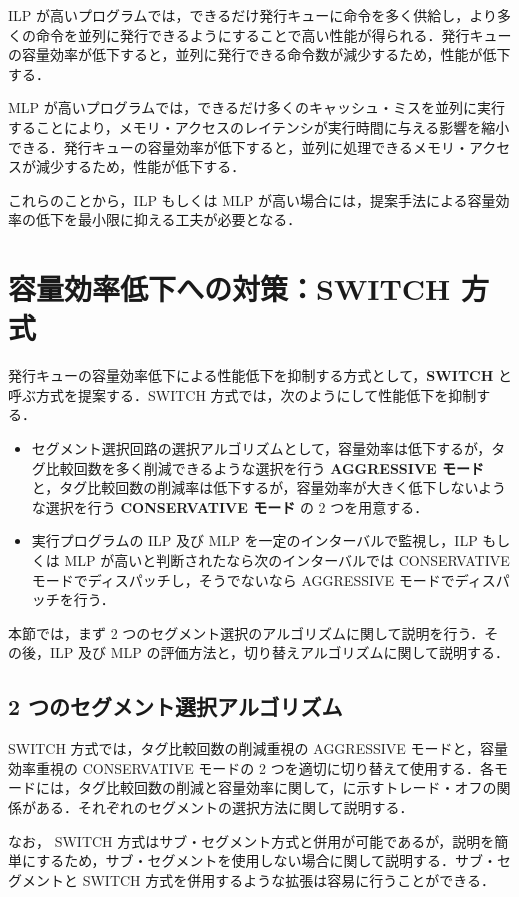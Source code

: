 ILP が高いプログラムでは，できるだけ発行キューに命令を多く供給し，より多くの命令を並列に発行できるようにすることで高い性能が得られる．発行キューの容量効率が低下すると，並列に発行できる命令数が減少するため，性能が低下する．

MLP が高いプログラムでは，できるだけ多くのキャッシュ・ミスを並列に実行することにより，メモリ・アクセスのレイテンシが実行時間に与える影響を縮小できる．発行キューの容量効率が低下すると，並列に処理できるメモリ・アクセスが減少するため，性能が低下する．

これらのことから，ILP もしくは MLP が高い場合には，提案手法による容量効率の低下を最小限に抑える工夫が必要となる．

\section{容量効率低下への対策：SWITCH 方式}
\label{sec:switch}
発行キューの容量効率低下による性能低下を抑制する方式として，\textbf{SWITCH} と呼ぶ方式を提案する．SWITCH 方式では，次のようにして性能低下を抑制する．
\begin{itemize}
  \item セグメント選択回路の選択アルゴリズムとして，容量効率は低下するが，タグ比較回数を多く削減できるような選択を行う \textbf{AGGRESSIVE モード} と，タグ比較回数の削減率は低下するが，容量効率が大きく低下しないような選択を行う \textbf{CONSERVATIVE モード} の 2 つを用意する．
  \item 実行プログラムの ILP 及び MLP を一定のインターバルで監視し，ILP もしくは MLP が高いと判断されたなら次のインターバルでは CONSERVATIVE モードでディスパッチし，そうでないなら AGGRESSIVE モードでディスパッチを行う．
\end{itemize}

本節では，まず 2 つのセグメント選択のアルゴリズムに関して説明を行う．その後，ILP 及び MLP の評価方法と，切り替えアルゴリズムに関して説明する．

\subsection{2 つのセグメント選択アルゴリズム}
SWITCH 方式では，タグ比較回数の削減重視の AGGRESSIVE モードと，容量効率重視の CONSERVATIVE モードの 2 つを適切に切り替えて使用する．各モードには，タグ比較回数の削減と容量効率に関して，に示すトレード・オフの関係がある．それぞれのセグメントの選択方法に関して説明する．

なお， SWITCH 方式はサブ・セグメント方式と併用が可能であるが，説明を簡単にするため，サブ・セグメントを使用しない場合に関して説明する．サブ・セグメントと SWITCH 方式を併用するような拡張は容易に行うことができる．

